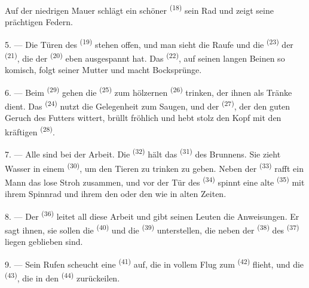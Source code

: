 Auf der niedrigen Mauer schlägt ein schöner  \textsuperscript{(18)} sein
Rad und zeigt seine prächtigen Federn.

\VUsaut{3.0mm}

5. --- Die Türen des  \textsuperscript{(19)} stehen offen, und man
sieht die Raufe und die  \textsuperscript{(23)} der 
\textsuperscript{(21)}, die der  \textsuperscript{(20)} eben
ausgespannt hat. Das  \textsuperscript{(22)}, auf seinen langen Beinen
so komisch, folgt seiner Mutter und macht Bocksprünge.

6. --- Beim  \textsuperscript{(29)} gehen die 
\textsuperscript{(25)} zum hölzernen  \textsuperscript{(26)} trinken, der
ihnen als Tränke dient. Das  \textsuperscript{(24)} nutzt die Gelegenheit
zum Saugen, und der  \textsuperscript{(27)}, der den guten Geruch des
Futters wittert, brüllt fröhlich und hebt stolz den Kopf mit den kräftigen
 \textsuperscript{(28)}.

7. --- Alle sind bei der Arbeit. Die  \textsuperscript{(32)} hält das
 \textsuperscript{(31)} des Brunnens. Sie zieht Wasser in einem
 \textsuperscript{(30)}, um den Tieren zu trinken zu geben. Neben der
 \textsuperscript{(33)} rafft ein Mann das lose Stroh zusammen, und
vor der Tür des  \textsuperscript{(34)} spinnt eine alte
 \textsuperscript{(35)} mit ihrem Spinnrad und ihrem
 den  oder den  wie in alten Zeiten.

\VUsaut{3.0mm}
\VUsaut{3.0mm}

8. --- Der  \textsuperscript{(36)} leitet all diese Arbeit und gibt
seinen Leuten die Anweisungen. Er sagt ihnen, sie sollen die 
\textsuperscript{(40)} und die  \textsuperscript{(39)}
unterstellen, die neben der  \textsuperscript{(38)} des 
\textsuperscript{(37)} liegen geblieben sind.

9. --- Sein Rufen scheucht eine  \textsuperscript{(41)} auf, die in
vollem Flug zum  \textsuperscript{(42)} flieht, und die
 \textsuperscript{(43)}, die in den 
\textsuperscript{(44)} zurückeilen.

